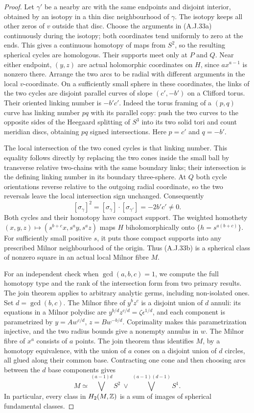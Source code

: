\begin{proof}
Let $\gamma'$ be a nearby arc with the same endpoints
and disjoint interior, obtained by an isotopy in a
thin disc neighbourhood of $\gamma$. The isotopy
keeps all other zeros of $v$ outside that disc.
Choose the arguments in (A.J.33a) continuously during
the isotopy; both coordinates tend uniformly to zero
at the ends. This gives a continuous homotopy of
maps from $S^2$, so the resulting spherical cycles
are homologous. Their supports meet only at $P$ and
$Q$. Near either endpoint, $(y,z)$ are actual
holomorphic coordinates on $H$, since $a x^{a-1}$
is nonzero there. Arrange the two arcs to be radial
with different arguments in the local $v$-coordinate.
On a sufficiently small sphere in these coordinates,
the links of the two cycles are disjoint parallel
curves of slope $(c',-b')$ on a Clifford torus.
Their oriented linking number is $-b'c'$.
Indeed the torus framing of a $(p,q)$ curve has
linking number $pq$ with its parallel copy: push the
two curves to the opposite sides of the Heegaard
splitting of $S^3$ into its two solid tori and count
meridian discs, obtaining $p q$ signed intersections.
Here $p=c'$ and $q=-b'$.

The local intersection of the two coned cycles is
that linking number. This equality follows directly
by replacing the two cones inside the small ball by
transverse relative two-chains with the same boundary
links; their intersection is the defining linking
number in its boundary three-sphere. At $Q$ both
cycle orientations reverse relative to the outgoing
radial coordinate, so the two reversals leave the
local intersection sign unchanged. Consequently
\[
 [\sigma_\gamma]^2
   =[\sigma_\gamma]\cdot[\sigma_{\gamma'}]
   =-2b'c'\ne0.                                  \tag{A.J.33b}
\]
Both cycles and their homotopy have compact support.
The weighted homothety
$(x,y,z)\mapsto(s^{b+c}x,s^a y,s^a z)$ maps
$H$ biholomorphically onto $\{h=s^{a(b+c)}\}$.
For sufficiently small positive $s$, it puts those
compact supports into any prescribed Milnor
neighbourhood of the origin. Thus (A.J.33b) is a
spherical class of nonzero square in an actual
local Milnor fibre $M$.

For an independent check when $\gcd(a,b,c)=1$,
we compute the full homotopy type and the rank of
the intersection form from two primary results.
The join theorem
\cite[Theorem L1 and Example 2.4(a)]{Nemethi1991Join}
applies to arbitrary analytic germs, including
non-isolated ones. Set $d=\gcd(b,c)$. The Milnor
fibre of $y^bz^c$ is a disjoint union of $d$ annuli:
its equations in a Milnor polydisc are
$y^{b/d}z^{c/d}=\zeta\epsilon^{1/d}$, and each
component is parametrized by
$y=A w^{c/d}$, $z=B w^{-b/d}$. Coprimality makes
this parametrization injective, and the two radius
bounds give a nonempty annulus in $w$.
The Milnor fibre of $x^a$ consists of $a$ points.
The join theorem thus identifies $M$, by a homotopy
equivalence, with the union of $a$ cones on a
disjoint union of $d$ circles, all glued along their
common base. Contracting one cone and then choosing
arcs between the $d$ base components gives
\[
 M\simeq
 \bigvee^{(a-1)d}S^2\ \vee\
 \bigvee^{(a-1)(d-1)}S^1.                          \tag{A.J.35}
\]
In particular, every class in $H_2(M,\mathbb Z)$ is a sum
of images of spherical fundamental classes.


\end{proof}
